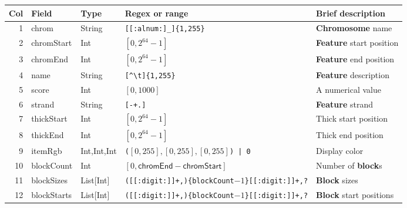 \documentclass[11pt]{article}
\begin{document}
\begin{adjustwidth}{-0.5in}{-0.5in}
  \noindent
  \begin{tabularx}{\linewidth}{r l l l L}
    \toprule
    Col & Field & Type & Regex or range & Brief description \\
     & \textsf{chrom} & String & \texttt{[[:alnum:]\_]\{1,255\}}{\footnotemark} & \textbf{Chromosome} name \\
    2 & \textsf{chromStart} & Int & $[0, 2^{64}-1]$ & \textbf{Feature} start position \\
    3 & \textsf{chromEnd} & Int & $[0, 2^{64} -1]$ & \textbf{Feature} end position \\
    4 & \textsf{name} & String & \texttt{[{\textasciicircum}{\textbackslash}t]\{1,255\}} & \textbf{Feature} description \\
    5 & \textsf{score} & Int & $[0, 1000]$ & A numerical value \\
    6 & \textsf{strand} & String & \texttt{[-+.]} & \textbf{Feature} strand \\
    7 & \textsf{thickStart} & Int & $[0, 2^{64}-1]$ & Thick start position \\
    8 & \textsf{thickEnd} & Int & $[0, 2^{64}-1]$ & Thick end position \\
    9 & \textsf{itemRgb} & Int,Int,Int & \texttt{(}$[0, 255], [0,255], [0,255]$\texttt{) | 0} & Display color \\ %
    10 & \textsf{blockCount} & Int & $[0, \textsf{chromEnd}-\textsf{chromStart}]${\footnotemark} & Number of \textbf{block}s \\
    11 & \textsf{blockSizes} & List[Int] & \texttt{([[:digit:]]+,)\{\textsf{blockCount}$-1$\}[[:digit:]]+,?}{\footnotemark} & \textbf{Block} sizes \\
    12 & \textsf{blockStarts} & List[Int] & \texttt{([[:digit:]]+,)\{\textsf{blockCount}$-1$\}[[:digit:]]+,?} & \textbf{Block} start positions \\
    \bottomrule
  \end{tabularx}\label{sec:table}
\end{adjustwidth}
\end{document}
